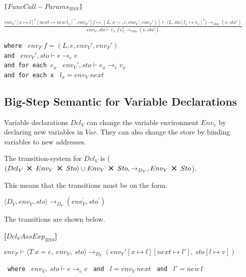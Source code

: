 \texttt{[$FuncCall-Params_{BSS}$]}
\begin{center}
	\Large
	\begin{math}
	\frac
	{env_V'[x \mapsto l]^*[next \mapsto new\ l_x]^*, env_F'[f \mapsto (L, x\sim, e, env_V', env_F')] \vdash \langle L, sto[l_x \mapsto v_x]^* \rangle \rightarrow_{stm} (v, sto')}
	{env_V, sto \vdash e_x\ f\ e_x^* \rightarrow_{stm} (v, sto')}
	\end{math}
\end{center}
\begin{center}
	\texttt{where } $env_F\ f = (L, e, env_V', env_F')$\\
	\texttt{and } $ env_V', sto \vdash e \rightarrow_{e} v$\\
	\texttt{and for each $e_x$ } $env_V', sto \vdash e_x \rightarrow_{e} v_x$ \\
	\texttt{and for each x } $l_x = env_V\ next$ 
\end{center}

\subsection{Big-Step Semantic for Variable Declarations}
Variable declarations $Dcl_V$ can change the variable environment $Env_v$ by declaring new variables in $Var$.
They can also change the store by binding variables to new addresses.

The transition-system for $Dcl_V$ is ($(Dcl_V\ \Cross\ Env_V\ \Cross\ Sto) \cup Env_V\ \Cross\ Sto, \rightarrow_{D_{V}}, Env_V\ \Cross\ Sto$).

This means that the transitions must be on the form.

\begin{center}
	$\langle D_V,env_V,sto \rangle \rightarrow_{D_V} (env_V^{'} , sto^{'})$
\end{center}

The transitions are shown below.

\textbf{[$Dcl_VAssExp_{BSS}$]}
\begin{center}
	\begin{math}
		{env_F \vdash \langle T\ x = e,\ env_V,\ sto \rangle \rightarrow_{D_V} (env_V'[x \mapsto l][next \mapsto l'],\ sto[l \mapsto v])}
	\end{math}
	
	\texttt{ where } $env_V,\ sto \vdash e \rightarrow_e v$
	\texttt{ and } $l = env_V\ next$
	\texttt{ and } $l' = new\ l$
\end{center}

